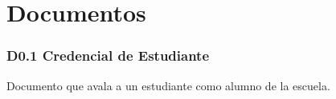 \chapter{Documentos}
\label{appendix:Documentos}


\subsection{D0.1 Credencial de Estudiante }

  Documento que avala a un estudiante como alumno de la escuela.
  
















